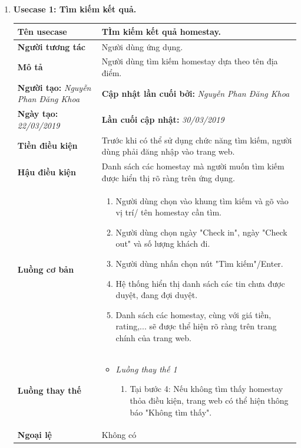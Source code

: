  \\
\begin{enumerate}[label=\textbf{(\alph*)}]
	\item \textbf{Usecase 1: Tìm kiếm kết quả.}
	\begin{center}
		\begin{longtable}{ | l |p{10cm}|}
			\hline
			\textbf{Tên usecase} & TÌm kiếm kết quả homestay. \\ \hline
			\textbf{Người tương tác} & Người dùng ứng dụng. \\ \hline   
			\textbf{Mô tả} &  Người dùng tìm kiếm homestay dựa theo tên địa điểm.\\ \hline  
			\textbf{Người tạo:} \textit{Nguyễn Phan Đăng Khoa} & \textbf{Cập nhật lần cuối bởi:} \textit{Nguyễn Phan Đăng Khoa} \\ \hline
			\textbf{Ngày tạo:} \textit{22/03/2019} & \textbf{Lần cuối cập nhật:} \textit{30/03/2019} \\ \hline
			\textbf{Tiền điều kiện} &  Trước khi có thể sử dụng chức năng tìm kiếm, người dùng phải đăng nhập vào trang web. \\ \hline 
			\textbf{Hậu điều kiện} &  Danh sách các homestay mà người muốn tìm kiếm được hiển thị rõ ràng trên ứng dụng. \\ \hline 
			\textbf{Luồng cơ bản} & 
			\begin{enumerate}
				\item Người dùng chọn vào khung tìm kiếm và gõ vào vị trí/ tên homestay cần tìm.
				\item Người dùng chọn ngày "Check in", ngày "Check out" và số lượng khách đi.
				\item Người dùng nhấn chọn nút "Tìm kiếm"/Enter.
				\item Hệ thống hiển thị danh sách các tin chưa được duyệt, đang đợi duyệt.
				\item Danh sách các homestay, cùng với giá tiền, rating,... sẽ được thể hiện rõ ràng trên trang chính của trang web.
			\end{enumerate} \\ \hline 
			\textbf{Luồng thay thế} & 
			\begin{itemize} 
				\item \textit{Luồng thay thế 1}
				\begin{enumerate}
					\item Tại bước 4: Nếu không tìm thấy homestay thỏa điều kiện, trang web có thể hiện thông báo "Không tìm thấy".
				\end{enumerate}
			\end{itemize} \\ \hline 
			\textbf{Ngoại lệ}  & Không có \\
			\hline
		\end{longtable}
	\end{center}
\end{enumerate}

